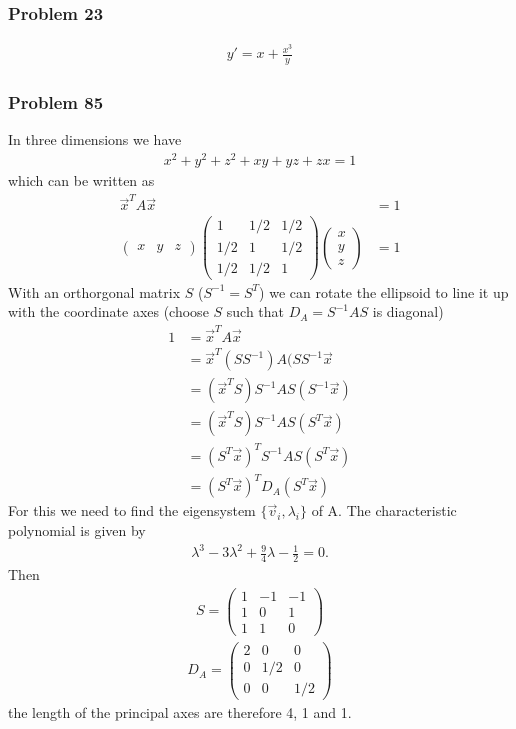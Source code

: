 \documentclass[10pt,a4paper]{book}
\theoremstyle{definition}
\begin{document}
\subsubsection{Problem 23}
\begin{align}
    y'=x+\frac{x^3}{y}
\end{align}

\subsubsection{Problem 85}
In three dimensions we have
\begin{align}
    x^2+y^2+z^2+xy+yz+zx=1
\end{align}
which can be written as
\begin{align}
\vec{x}^TA\vec{x}&=1\\
\begin{pmatrix}
x & y & z
\end{pmatrix}
\begin{pmatrix}
1 & 1/2 & 1/2\\
1/2 & 1 & 1/2\\
1/2 & 1/2 & 1
\end{pmatrix}
\begin{pmatrix}
x\\
y\\
z
\end{pmatrix}&=1
\end{align}
With an orthorgonal matrix $S$ ($S^{-1}=S^T$) we can rotate the ellipsoid to line it up with the coordinate axes (choose $S$ such that $D_A=S^{-1}AS$ is diagonal)
\begin{align}
1&=\vec{x}^TA\vec{x}\\
&=\vec{x}^T(SS^{-1})A(SS^{-1}\vec{x}\\
&=(\vec{x}^TS)S^{-1}AS(S^{-1}\vec{x})\\
&=(\vec{x}^TS)S^{-1}AS(S^T\vec{x})\\
&=(S^T\vec{x})^TS^{-1}AS(S^T\vec{x})\\
&=(S^T\vec{x})^TD_A(S^T\vec{x})
\end{align}
For this we need to find the eigensystem $\{\vec{v}_i,\lambda_i\}$ of A. The characteristic polynomial is given by
\begin{align}
    \lambda^3-3\lambda^2+\frac{9}{4}\lambda-\frac{1}{2}=0.
\end{align}
Then
\begin{align}
S=\begin{pmatrix}
1 & -1&-1\\
1 & 0 & 1\\
1 & 1 & 0
\end{pmatrix}
\end{align}
\begin{align}
D_A=\begin{pmatrix}
2 & 0   & 0\\
0 & 1/2 & 0\\
0 & 0   & 1/2
\end{pmatrix}
\end{align}
the length of the principal axes are therefore 4, 1 and 1.
\end{document}
